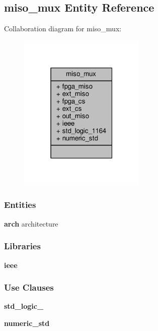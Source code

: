 \subsection{miso\+\_\+mux Entity Reference}
\label{classmiso__mux}


Collaboration diagram for miso\+\_\+mux\+:\nopagebreak
\begin{figure}[H]
\begin{center}
\leavevmode
\includegraphics[width=171pt]{d3/d39/classmiso__mux__coll__graph}
\end{center}
\end{figure}
\subsubsection*{Entities}
\begin{DoxyCompactItemize}
\item 
{\bf arch} architecture
\end{DoxyCompactItemize}
\subsubsection*{Libraries}
 \begin{DoxyCompactItemize}
\item 
{\bf ieee} 
\end{DoxyCompactItemize}
\subsubsection*{Use Clauses}
 \begin{DoxyCompactItemize}
\item 
{\bf std\+\_\+logic\+\_}   
\item 
{\bf numeric\+\_\+std}   
\end{DoxyCompactItemize}
